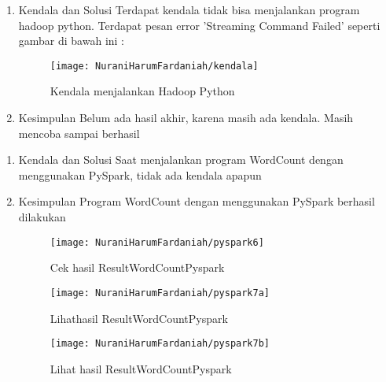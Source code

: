 \begin{enumerate}
\item Kendala dan Solusi
\newline Terdapat kendala tidak bisa menjalankan program hadoop
python. Terdapat pesan error 'Streaming Command Failed' seperti gambar di bawah ini :

\begin{figure}[!ht]
\texttt{[image: NuraniHarumFardaniah/kendala]}
\caption{Kendala menjalankan Hadoop Python}
\label{gam:perkuliahan-25-11}
\end{figure}

\item Kesimpulan
\newline Belum ada hasil akhir, karena masih ada kendala. Masih mencoba sampai berhasil
\end{enumerate}

\begin{enumerate}
\item Kendala dan Solusi
\newline Saat menjalankan program WordCount dengan menggunakan PySpark, tidak ada kendala apapun
\item Kesimpulan
\newline Program WordCount dengan menggunakan PySpark berhasil dilakukan

\newpage
\begin{figure}[!ht]
\texttt{[image: NuraniHarumFardaniah/pyspark6]}
\caption{Cek hasil ResultWordCountPyspark}
\label{gam:perkuliahan-25-11}
\end{figure}

\begin{figure}[!ht]
\texttt{[image: NuraniHarumFardaniah/pyspark7a]}
\caption{Lihathasil ResultWordCountPyspark}
\label{gam:perkuliahan-25-11}
\end{figure}

\begin{figure}[!ht]
\texttt{[image: NuraniHarumFardaniah/pyspark7b]}
\caption{Lihat hasil ResultWordCountPyspark}
\label{gam:perkuliahan-25-11}
\end{figure}
\end{enumerate}
